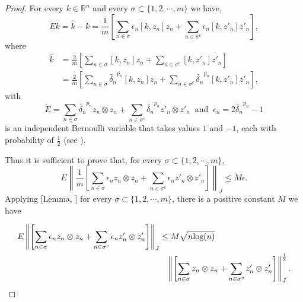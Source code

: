 \documentclass[article,12pt]{amsart}
\begin{document}
\begin{proof}
For every $k \in \mathbb R^n$ and every $\sigma \subset \{1, 2, \cdots, m\}$ we have,
\begin{equation*}
\tilde{E} k = \hat k-k = \frac{1}{m} \left [\sum\limits_{n \in \sigma} \epsilon_n [k, z_n]z_n + \sum\limits_{n \in \sigma^c} \epsilon_n [k, z'_n]z'_n \right],
\end{equation*}
where 
\begin{align*}
\hat k & = \frac{2}{m}  \left [\sum\limits_{n \in \sigma} [k, z_n]z_n + \sum\limits_{n \in \sigma^c} [k, z'_n]z'_n \right]\\ 
& =\frac{2}{m}  \left [\sum\limits_{n \in \sigma} \tilde{\delta_n}^{p_n} [k, z_n]z_n + \sum\limits_{n \in \sigma^c} \tilde{\delta_n}^{p_n} [k, z'_n]z'_n \right],
\end{align*}
 with
$$
\tilde{E}=\sum\limits_{n \in \sigma} \tilde{\delta_n}^{p_n} z_n \otimes z_n + \sum\limits_{n \in \sigma^c} \tilde{\delta_n}^{p_n} z'_n \otimes z'_n 
~\mbox{ and }~
\epsilon_n = 2\tilde{\delta_n}^{p_n} - 1
$$ is an independent Bernoulli variable that takes values $1$ and $-1$, each with probability of $\frac{1}{2}$ (see \cite{Pa99}).

Thus it is sufficient to prove that, for every $\sigma \subset \{1, 2, \cdots, m\}$,
\begin{equation*}
E\left \|  \frac{1}{m} \left [\sum\limits_{n \in \sigma} \epsilon_n z_n \otimes z_n + \sum\limits_{n \in \sigma^c} \epsilon_n  z'_n \otimes z'_n \right] \right \|_{J} \leq M \epsilon.
\end{equation*}
Applying [Lemma, \cite{Ru99}] for every $\sigma \subset \{1, 2, \cdots, m\}$, there is a positive constant $M$ we have 

\begin{align}\label{app1}
E\left \| \left [\sum\limits_{n \in \sigma} \epsilon_n z_n \otimes z_n + \sum\limits_{n \in \sigma^c} \epsilon_n  z'_n \otimes z'_n \right] \right \|_{J}
& \leq  M \sqrt{n \text{log}(n)}\\
\nonumber & \hspace{0.3cm} \left \| \left [\sum\limits_{n \in \sigma} z_n \otimes z_n + \sum\limits_{n \in \sigma^c}  z'_n \otimes z'_n \right] \right \|^{\frac{1}{2}}_{J}.
\end{align}





\end{proof}
\end{document}
